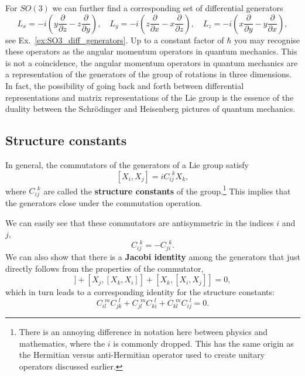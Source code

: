 \documentclass[notes.tex]{subfiles}
\begin{document}
For $SO(3)$ we can further find a corresponding set of differential generators
\begin{equation}
L_x=-i\left(y\frac{\partial}{\partial z}-z\frac{\partial}{\partial y} \right),\quad
L_y=-i\left(z\frac{\partial}{\partial x}-x\frac{\partial}{\partial z} \right),\quad
L_z=-i\left(x\frac{\partial}{\partial y}-y\frac{\partial}{\partial x} \right),
\label{eq:SO3_diff_generators}
\end{equation}
see Ex.~\ref{ex:SO3_diff_generators}.
Up to a constant factor of $\hbar$ you may recognise these operators as the angular momentum operators in quantum mechanics. This is not a coincidence, the angular momentum operators in quantum mechanics are a representation of the generators of the group of rotations in three dimensions. In fact, the possibility of going back and forth between differential representations and matrix representations of the Lie group is the essence of the duality between the Schr\"odinger and Heisenberg pictures of quantum mechanics.


\subsection{Structure constants}
\label{sec:structure_constants}

In general, the commutators of the generators of a Lie group satisfy \[[X_i,X_j]=iC_{ij}^{~~k}X_k,\] where  $C_{ij}^{~~k}$ are called the {\bf structure constants} of the group.\footnote{There is an annoying difference in notation here between physics and mathematics, where the $i$ is commonly dropped. This has the same origin as the Hermitian versus anti-Hermitian operator used to create unitary operators discussed earlier.} 
This implies that the generators close under the commutation operation.

We can easily see that these commutators are antisymmetric in the indices $i$ and $j$, 
\[C_{ij}^{~~k} = -C_{ji}^{~~k}.\]
We can also show that there is a {\bf Jacobi identity} among the generators that just directly follows from the properties of the commutator,
\begin{equation}
[X_i, [X_j, X_k]] + [X_j, [X_k, X_i]] + [X_k, [X_i, X_j]] = 0,
\label{eq:Jacobi_generators}
\end{equation}
which in turn leads to a corresponding identity for the structure constants:
\begin{equation}
C_{il}^{~~m}C_{jk}^{~~l} + C_{jl}^{~~m}C_{ki}^{~~l} + C_{kl}^{~~m}C_{ij}^{~~l} = 0.
\label{eq:Jacobi_structure_constants}
\end{equation}
\end{document}
